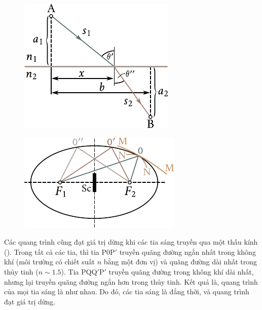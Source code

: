 \begin{figure}[!htb]
	\begin{minipage}[t]{0.48\linewidth}
		\begin{center}
			\includegraphics[scale=1]{figures/ch_16/fig_16_8.pdf}
			\caption[]{}
			\label{fig:16_8}
		\end{center}
	\end{minipage}
	\hfill{ }%
	\begin{minipage}[t]{0.48\linewidth}
		\begin{center}
			\includegraphics[scale=1]{figures/ch_16/fig_16_9.pdf}
            \caption[]{}
			\label{fig:16_9}
		\end{center}
	\end{minipage}
\vspace{-0.4cm}
\end{figure}

Các quang trình cũng đạt giá trị dừng khi các tia sáng truyền qua một thấu kính ().
Trong tất cả các tia, thì tia P$0$P$'$ truyền quãng đường ngắn nhất trong không khí (môi trường có chiết suất $n$ bằng một đơn vị) và quãng đường dài nhất trong thủy tinh ($n\sim 1.5$).
Tia PQQ$'$P$'$ truyền quãng đường trong không khí dài nhất, nhưng lại truyền quãng đường ngắn hơn trong thủy tinh.
Kết quả là, quang trình của mọi tia sáng là như nhau.
Do đó, các tia sáng là đẳng thời, và quang trình đạt giá trị dừng.

